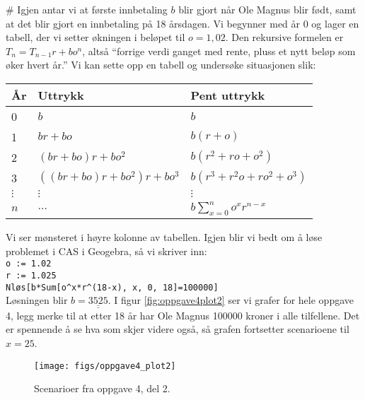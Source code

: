 \documentclass[12pt, a4paper]
{article}						%
\def\answer#1{\underline{\underline{#1}}}
\newcommand{\figwidth}{0.75}
\begin{document}
\begin{easylist}[enumerate]
	# Igjen antar vi at første innbetaling $b$ blir gjort når Ole Magnus blir født, samt at det blir gjort en innbetaling på 18 årsdagen.
	Vi begynner med år 0 og lager en tabell, der vi setter økningen i beløpet til $o = 1,02$.
	Den rekursive formelen er $T_n = T_{n-1}r + bo^n$, altså ``forrige verdi ganget med rente, pluss et nytt beløp som øker hvert år.''
	Vi kan sette opp en tabell og undersøke situasjonen slik:
	\begin{center}
		\begin{tabular}{l|l|l}
			\textbf{År} & \textbf{Uttrykk} & \textbf{Pent uttrykk} \\ \hline
			0 & $b$ & $b$ \\
			1 & $br + bo$ & $b(r+o)$ \\
			2 & $\left(br + bo\right)r + bo^2$ & $b(r^2 + ro + o^2)$ \\
			3 & $\left( \left(br + bo\right)r + bo^2 \right)r + bo^3$ & $b(r^3 + r^2o + ro^2 + o^3)$ \\
			$\vdots$ & $\vdots$ & $\vdots$ \\
			$n$ & $\dots$ & $b \sum_{x = 0}^{n} o^x r^{n-x}$
		\end{tabular}
	\end{center}
	Vi ser mønsteret i høyre kolonne av tabellen.
	Igjen blir vi bedt om å løse problemet i CAS i Geogebra, så vi skriver inn: \\
	\texttt{o := 1.02} \\
	\texttt{r := 1.025} \\
	\texttt{Nløs[b*Sum[o\textasciicircum x*r\textasciicircum (18-x), x, 0, 18]=100000]} \\
	Løsningen blir $b = \answer{3525}$. I figur \eqref{fig:oppgave4plot2} ser vi grafer for hele oppgave 4, legg merke til at etter 18 år har Ole Magnus 100000 kroner i alle tilfellene. Det er spennende å se hva som skjer videre også, så grafen fortsetter scenarioene til $x=25$.
	\begin{figure}[th!]
		\centering
		\texttt{[image: figs/oppgave4\_plot2]}
		\caption{Scenarioer fra oppgave 4, del 2.}
		\label{fig:oppgave4plot2}
	\end{figure}
\end{easylist}
\end{document}
